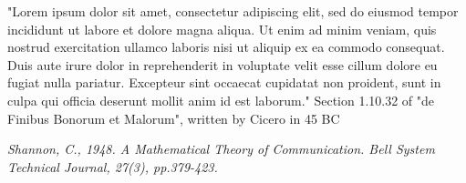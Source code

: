 \documentclass[11pt]{article}
\begin{document}
			"Lorem ipsum dolor sit amet, consectetur adipiscing elit, sed do eiusmod tempor incididunt ut labore et dolore magna aliqua. Ut enim ad minim veniam, quis nostrud exercitation ullamco laboris nisi ut aliquip ex ea commodo consequat. Duis aute irure dolor in reprehenderit in voluptate velit esse cillum dolore eu fugiat nulla pariatur. Excepteur sint occaecat cupidatat non proident, sunt in culpa qui officia deserunt mollit anim id est laborum."
			Section 1.10.32 of "de Finibus Bonorum et Malorum", written by Cicero in 45 BC
		
		 
		
	
	\pagebreak
	\begin{thebibliography}{1}	
		\textit{Shannon, C., 1948. A Mathematical Theory of Communication. Bell System Technical Journal, 27(3), pp.379-423.}
		
	\end{thebibliography}
\end{document}
